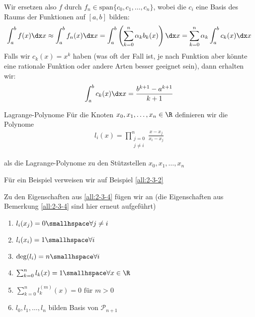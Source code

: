 Wir ersetzen also $f$ durch $f_n \in \text{span} \{ c_0, c_1, \ldots, c_n \}$, wobei die $c_i$ eine Basis des Raums der Funktionen auf $[a, b]$ bilden:
\rmvspace
\begin{align*}
    \int_{a}^{b} f(x) \dx x \approx \int_{a}^{b} f_n(x) \dx x = \int_{a}^{b} \left( \sum_{k = 0}^{n} \alpha_k b_k(x) \right) \dx x = \sum_{k = 0}^{n} \alpha_k \int_{a}^{b} c_k(x) \dx x
\end{align*}
Falls wir $c_k(x) = x^k$ haben (was oft der Fall ist, je nach Funktion aber könnte eine rationale Funktion oder andere Arten besser geeignet sein), dann erhalten wir:
\rmvspace
\begin{align*}
    \int_{a}^{b} c_k(x) \dx x = \frac{b^{k + 1} - a^{k + 1}}{k + 1}
\end{align*}

\begin{definition}[]{Lagrange-Polynome}
    Für die Knoten $x_0, x_1, \ldots, x_n \in \R$ definieren wir die Polynome
    \rmvspace
    \begin{align*}
        l_i(x) = \prod_{\substack{j = 0\\ j \neq i}}^n \frac{x - x_j}{x_i - x_j}
    \end{align*}

    \rmvspace
    als die Lagrange-Polynome zu den Stützstellen $x_0, x_1, \ldots, x_n$
\end{definition}
Für ein Beispiel verweisen wir auf Beispiel \ref{all:2-3-2}

 Zu den Eigenschaften aus \ref{all:2-3-4} fügen wir an (die Eigenschaften aus Bemerkung \ref{all:2-3-4} sind hier erneut aufgeführt)
\begin{multicols}{2}
    \begin{enumerate}
        \item $l_i(x_j) = 0 \smallhspace \forall j \neq i$
        \item $l_i(x_i) = 1 \smallhspace \forall i$
        \item $\deg(l_i) = n \smallhspace \forall i$
        \item $\sum_{k = 0}^{n} l_k(x) = 1 \smallhspace \forall x \in \R$
        \item $\sum_{k = 0}^{n} l_k^{(m)}(x) = 0 \text{ für } m > 0$
        \item $l_0, l_1, \ldots, l_n$ bilden Basis von $\mathcal{P}_{n + 1}$
    \end{enumerate}
\end{multicols}

